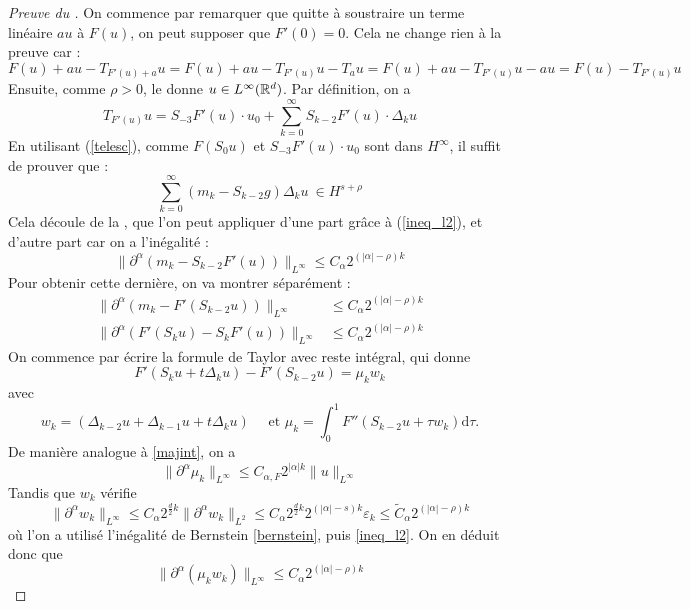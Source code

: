 \documentclass[11pt,a4paper]{article}
\begin{document}
\begin{proof}[Preuve du ]On commence par remarquer que quitte à soustraire un terme linéaire $au$ à $F(u)$, on peut supposer que $F'(0)=0$. Cela ne change rien à la preuve car :
\[F(u)+au - T_{F'(u) + a}u = F(u) + au - T_{F'(u)}u  -T_{a}u =  F(u) + au - T_{F'(u)}u  -au =  F(u) - T_{F'(u)}u \]
Ensuite, comme $\rho >0$, le  donne $u\in L^\infty(\mathbb R^d)$. Par définition, on a \[T_{F'(u)}u = S_{-3}F'(u)\cdot u_0 + \sum_{k=0}^\infty S_{k-2} F'(u)\cdot \Delta_k u \]
En utilisant (\ref{telesc}), comme $F(S_0u)$ et $S_{-3}F'(u) \cdot u_0$ sont dans $H^\infty$, il suffit de prouver que :
\[\sum_{k=0}^\infty(m_k-S_{k-2}g)\Delta_k u \ \in H^{s+\rho}\]
Cela découle de la , que l'on peut appliquer d'une part grâce à (\ref{ineq_l2}), et d'autre part car on a l'inégalité :
\begin{equation*}
\| \partial^\alpha (m_k - S_{k-2}F'(u))\|_{L^\infty} \leq C_\alpha 2^{(|\alpha|-\rho)k}
\end{equation*} 
Pour obtenir cette dernière, on va montrer séparément :
\begin{align}
\| \partial^\alpha (m_k - F'(S_{k-2}u))\|_{L^\infty} &\leq C_\alpha 2^{(|\alpha|-\rho)k} \label{eq1} \\
\| \partial^\alpha (F'(S_{k}u) - S_kF'(u))\|_{L^\infty} &\leq C_\alpha 2^{(|\alpha|-\rho)k} \label{eq2}
\end{align}
On commence par écrire la formule de Taylor avec reste intégral, qui donne 
\[F'(S_ku+t\Delta_ku)-F'(S_{k-2}u)=\mu_kw_k\]
avec 
\begin{equation*}
w_k=(\Delta_{k-2}u + \Delta_{k-1}u + t\Delta_ku) \quad \text{ et } \mu_k = \int_0^1F''(S_{k-2}u + \tau w_k)\mathrm{d}\tau.
\end{equation*}
De manière analogue à \eqref{majint}, on a 
\begin{equation*}
\|\partial^\alpha \mu_k \|_{L^\infty} \leq C_{\alpha,F} 2^{|\alpha|k} \|u\|_{L^\infty}
\end{equation*}
Tandis que $w_k$ vérifie
\begin{equation*}
\| \partial^\alpha w_k\|_{L^\infty} \leq C_{\alpha} 2^{\frac{d}{2}k} \| \partial^\alpha w_k\|_{L^2} \leq C_{\alpha} 2^{\frac{d}{2}k} 2^{(|\alpha|-s)k} \varepsilon_k  \leq \tilde{C}_{\alpha} 2^{(|\alpha|-\rho)k}
\end{equation*}
où l'on a utilisé l'inégalité de Bernstein \eqref{bernstein}, puis \eqref{ineq_l2}. On en déduit donc que 
\begin{equation*}
\|\partial^\alpha (\mu_kw_k)\|_{L^\infty} \leq C_\alpha 2^{(|\alpha|-\rho)k} 

\end{equation*}
\end{proof}
\end{document}
